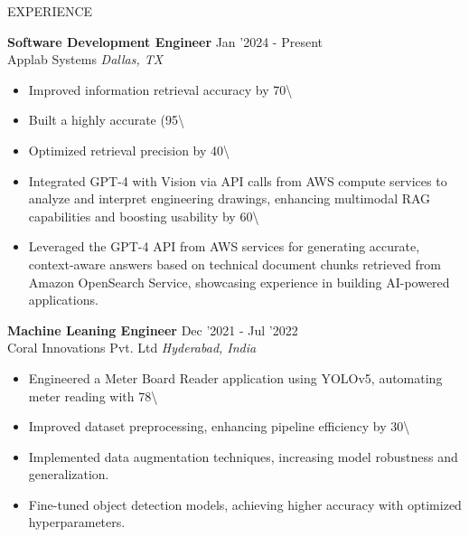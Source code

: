 \documentclass{resume}
\begin{document}
\begin{rSection}{EXPERIENCE}

\textbf{Software Development Engineer} \hfill Jan '2024 - Present\\
Applab Systems \hfill \textit{Dallas, TX}
\begin{itemize}
    \itemsep -3pt {} 
     \item Improved information retrieval accuracy by 70\textbackslash{}%
     \item Built a highly accurate (95\textbackslash{}%
     \item Optimized retrieval precision by 40\textbackslash{}%
     \item Integrated GPT-4 with Vision via API calls from AWS compute services to analyze and interpret engineering drawings, enhancing multimodal RAG capabilities and boosting usability by 60\textbackslash{}%
     \item Leveraged the GPT-4 API from AWS services for generating accurate, context-aware answers based on technical document chunks retrieved from Amazon OpenSearch Service, showcasing experience in building AI-powered applications.
\end{itemize}

\textbf{Machine Leaning Engineer} \hfill Dec '2021 - Jul '2022\\
Coral Innovations Pvt. Ltd \hfill \textit{Hyderabad, India}
\begin{itemize}
    \itemsep -3pt {} 
     \item Engineered a Meter Board Reader application using YOLOv5, automating meter reading with 78\textbackslash{}%
     \item Improved dataset preprocessing, enhancing pipeline efficiency by 30\textbackslash{}%
     \item Implemented data augmentation techniques, increasing model robustness and generalization.
     \item Fine-tuned object detection models, achieving higher accuracy with optimized hyperparameters.
\end{itemize}

\end{rSection}
\end{document}
